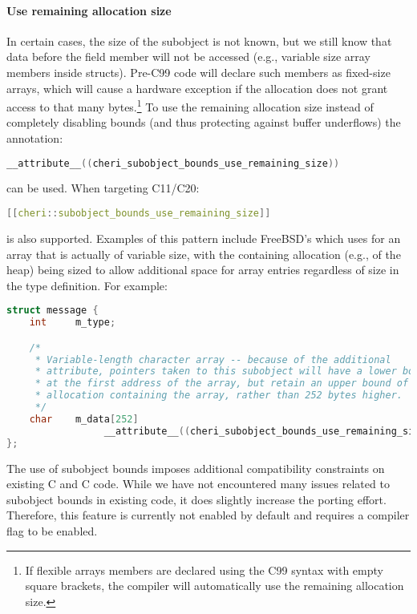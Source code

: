 \documentclass[12pt,twoside,openright,usletter]{article}
\newcommand{\ccode}[1]{{\small\ttfamily{#1}}}
\newcommand*{\cpp}[1][]{C\textsmaller[2]{\nolinebreak[4]\hspace{-.05em}\raisebox{.45ex}{\textbf{++}}}}
\begin{document}
\paragraph{Use remaining allocation size}
In certain cases, the size of the subobject is not known, but we still know that data
before the field member will not be accessed (e.g., variable size array members
inside structs).
Pre-C99 code will declare such members as fixed-size arrays, which will cause
a hardware exception if the allocation does not grant access to that many bytes.\footnote{%
If flexible arrays members are declared using the C99 syntax with empty square
brackets, the compiler will automatically use the remaining allocation size.}
To use the remaining allocation size instead of completely disabling bounds
(and thus protecting against buffer underflows) the annotation:

\begin{lstlisting}[language={C}]
__attribute__((cheri_subobject_bounds_use_remaining_size))
\end{lstlisting}

\noindent
can be used.
When targeting \cpp{}11/C20:

\begin{lstlisting}[language={C++}]
[[cheri::subobject_bounds_use_remaining_size]]
\end{lstlisting}

\noindent
is also supported.
Examples of this pattern include FreeBSD's \ccode{struct dirent} which uses
\ccode{char d\_name[255]} for an array that is actually of variable size, with
the containing allocation (e.g., of the heap) being sized to allow additional
space for array entries regardless of size in the type definition.
For example:

\begin{lstlisting}[language={C}]
struct message {
    int     m_type;

    /*
     * Variable-length character array -- because of the additional
     * attribute, pointers taken to this subobject will have a lower bound
     * at the first address of the array, but retain an upper bound of the
     * allocation containing the array, rather than 252 bytes higher.
     */
    char    m_data[252]
                 __attribute__((cheri_subobject_bounds_use_remaining_size));
};
\end{lstlisting}

The use of subobject bounds imposes additional compatibility constraints on
existing C and \cpp{} code.
While we have not encountered many issues related to subobject bounds in
existing code, it does slightly increase the porting effort.
Therefore, this feature is currently not enabled by default and requires a
compiler flag to be enabled.
\end{document}
